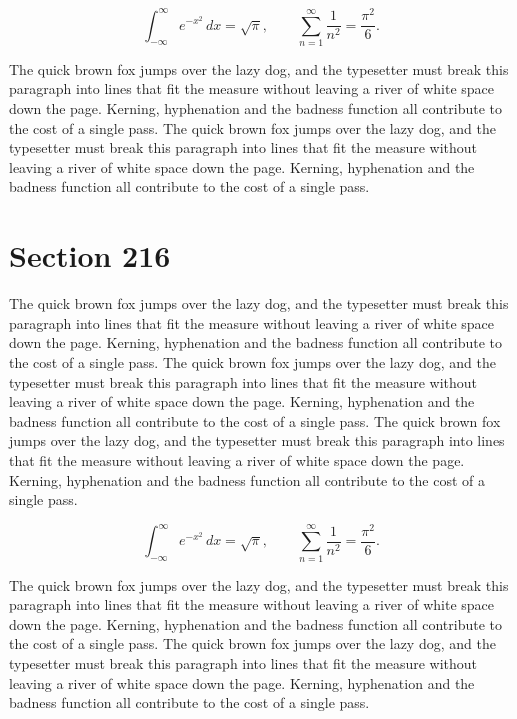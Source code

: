 \documentclass{article}
\begin{document}
\begin{equation}
\int_{-\infty}^{\infty} e^{-x^{2}}\,dx = \sqrt{\pi}, \qquad
\sum_{n=1}^{\infty} \frac{1}{n^{2}} = \frac{\pi^{2}}{6}.
\end{equation}

The quick brown fox jumps over the lazy dog, and the typesetter must break this paragraph into lines that fit the measure without leaving a river of white space down the page. Kerning, hyphenation and the badness function all contribute to the cost of a single pass. The quick brown fox jumps over the lazy dog, and the typesetter must break this paragraph into lines that fit the measure without leaving a river of white space down the page. Kerning, hyphenation and the badness function all contribute to the cost of a single pass. 
\section{Section 216}
The quick brown fox jumps over the lazy dog, and the typesetter must break this paragraph into lines that fit the measure without leaving a river of white space down the page. Kerning, hyphenation and the badness function all contribute to the cost of a single pass. The quick brown fox jumps over the lazy dog, and the typesetter must break this paragraph into lines that fit the measure without leaving a river of white space down the page. Kerning, hyphenation and the badness function all contribute to the cost of a single pass. The quick brown fox jumps over the lazy dog, and the typesetter must break this paragraph into lines that fit the measure without leaving a river of white space down the page. Kerning, hyphenation and the badness function all contribute to the cost of a single pass. 

\begin{equation}
\int_{-\infty}^{\infty} e^{-x^{2}}\,dx = \sqrt{\pi}, \qquad
\sum_{n=1}^{\infty} \frac{1}{n^{2}} = \frac{\pi^{2}}{6}.
\end{equation}

The quick brown fox jumps over the lazy dog, and the typesetter must break this paragraph into lines that fit the measure without leaving a river of white space down the page. Kerning, hyphenation and the badness function all contribute to the cost of a single pass. The quick brown fox jumps over the lazy dog, and the typesetter must break this paragraph into lines that fit the measure without leaving a river of white space down the page. Kerning, hyphenation and the badness function all contribute to the cost of a single pass. 
\end{document}
